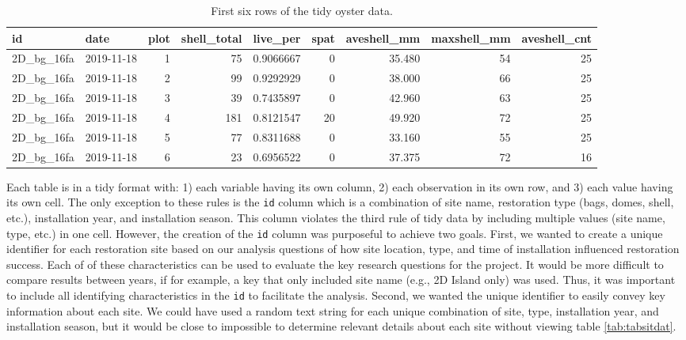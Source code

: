 \documentclass[
]{book}
\begin{document}
\begin{table}

\caption{\label{tab:taboysdat}First six rows of the tidy oyster data.}
\centering
\begin{tabular}[t]{l|l|r|r|r|r|r|r|r}
\hline
id & date & plot & shell\_total & live\_per & spat & aveshell\_mm & maxshell\_mm & aveshell\_cnt\\
\hline
2D\_bg\_16fa & 2019-11-18 & 1 & 75 & 0.9066667 & 0 & 35.480 & 54 & 25\\
\hline
2D\_bg\_16fa & 2019-11-18 & 2 & 99 & 0.9292929 & 0 & 38.000 & 66 & 25\\
\hline
2D\_bg\_16fa & 2019-11-18 & 3 & 39 & 0.7435897 & 0 & 42.960 & 63 & 25\\
\hline
2D\_bg\_16fa & 2019-11-18 & 4 & 181 & 0.8121547 & 20 & 49.920 & 72 & 25\\
\hline
2D\_bg\_16fa & 2019-11-18 & 5 & 77 & 0.8311688 & 0 & 33.160 & 55 & 25\\
\hline
2D\_bg\_16fa & 2019-11-18 & 6 & 23 & 0.6956522 & 0 & 37.375 & 72 & 16\\
\hline
\end{tabular}
\end{table}

Each table is in a tidy format with: 1) each variable having its own column, 2) each observation in its own row, and 3) each value having its own cell. The only exception to these rules is the \texttt{id} column which is a combination of site name, restoration type (bags, domes, shell, etc.), installation year, and installation season. This column violates the third rule of tidy data by including multiple values (site name, type, etc.) in one cell. However, the creation of the \texttt{id} column was purposeful to achieve two goals. First, we wanted to create a unique identifier for each restoration site based on our analysis questions of how site location, type, and time of installation influenced restoration success. Each of of these characteristics can be used to evaluate the key research questions for the project. It would be more difficult to compare results between years, if for example, a key that only included site name (e.g., 2D Island only) was used. Thus, it was important to include all identifying characteristics in the \texttt{id} to facilitate the analysis. Second, we wanted the unique identifier to easily convey key information about each site. We could have used a random text string for each unique combination of site, type, installation year, and installation season, but it would be close to impossible to determine relevant details about each site without viewing table \ref{tab:tabsitdat}.
\end{document}
